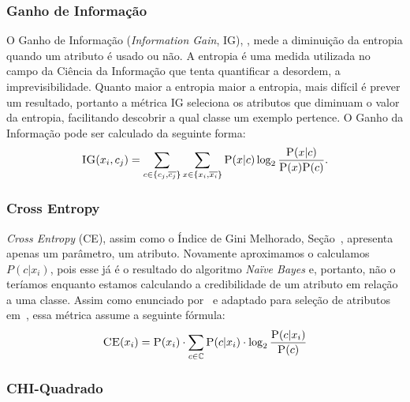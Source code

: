 \subsubsection{Ganho de Informação}
\label{subsubsection::ig}

O Ganho de Informação (\textit{Information Gain}, \textsc{IG}), \cite{Yang97}, mede a diminuição da entropia quando um atributo é usado ou não. A entropia é uma medida utilizada no campo da Ciência da Informação que tenta quantificar a desordem, a imprevisibilidade. Quanto maior a entropia maior a entropia, mais difícil é prever um resultado, portanto a métrica IG seleciona os atributos que diminuam o valor da entropia, facilitando descobrir a qual classe um exemplo pertence. O Ganho da Informação pode ser calculado da seguinte forma:
\begin{equation}\label{eqn::ig}
 \textsc{IG}(x_i, c_j) = \sum_{c \in \{c_j, \overline{c_j}\}}\sum_{x \in \{x_i, \overline{x_i}\}} \textsc{P}(x|c)\log_2\frac{\textsc{P}(x|c)}{ \textsc{P}(x)\textsc{P}(c)}.
\end{equation}

\subsubsection{Cross Entropy}
\label{subsubsection::}

\textit{Cross Entropy} (\textsc{CE}), assim como o Índice de Gini Melhorado, Seção~\cite{subsubsection::gini}, apresenta apenas um parâmetro, um atributo. Novamente aproximamos o calculamos $P(c|x_i)$, pois esse já é o resultado do algoritmo \textit{Naïve Bayes} e, portanto, não o teríamos enquanto estamos calculando a credibilidade de um atributo em relação a uma classe. Assim como enunciado por~\cite{Koller97} e adaptado para seleção de atributos em~\cite{Mladenic98}, essa métrica assume a seguinte fórmula:
\begin{equation}\label{eqn::ce}
 \textsc{CE}(x_i) =  \textsc{P}(x_i) \cdot \sum_{c \in \mathbb{C}} \textsc{P}(c|x_i) \cdot \log_2 \frac{ \textsc{P}(c|x_i) } {\textsc{P}(c) }
\end{equation}

\subsubsection{CHI-Quadrado}
\label{subsubsection::chi}

